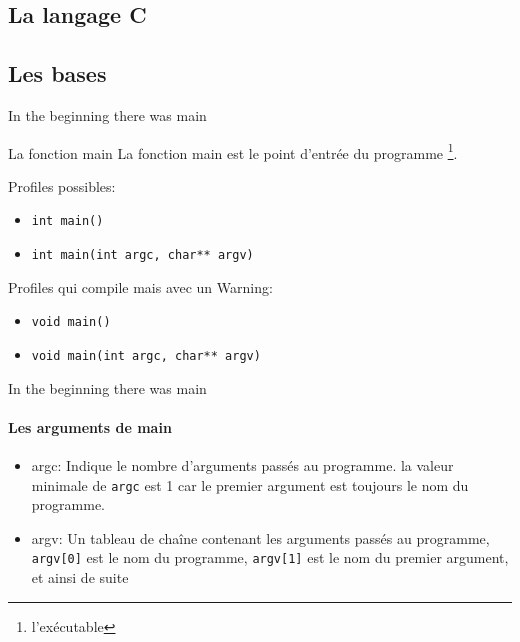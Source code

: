 \documentclass{beamer}
\begin{document}
\begin{darkframes}
  	\section{La langage C}
  	\subsection{Les bases}
  	\begin{frame}{In the beginning there was main}
  		\begin{block}{La fonction main}
  			La fonction \alert{main} est le point d'entrée du programme \footnote[frame]{l'exécutable}.
  		\end{block}
  		\begin{exampleblock}{Profiles possibles:}
  			\begin{itemize}
  				\item \texttt{int main()}
  				\item \texttt{int main(int argc, char** argv)}
  			\end{itemize}
  		\end{exampleblock}
  		\begin{alertblock}{Profiles qui compile mais avec un Warning:}
  			\begin{itemize}
	  			\item \texttt{void main()}
	  			\item \texttt{void main(int argc, char** argv)}
  			\end{itemize}
  		\end{alertblock}
  	\end{frame}
  
  	\begin{frame}{In the beginning there was main}
		\framesubtitle{Les arguments de main}
		\begin{itemize}
			\item \alert{argc}: Indique le nombre d'arguments passés au programme. la valeur minimale de \texttt{argc} est 1 car le premier argument est toujours le nom du programme.
			\item \alert{argv}: Un tableau de chaîne contenant les arguments passés au programme, \texttt{argv[0]} est le nom du programme, \texttt{argv[1]} est le nom du premier argument, et ainsi de suite
		\end{itemize}
  	\end{frame}
  

\end{darkframes}
\end{document}
